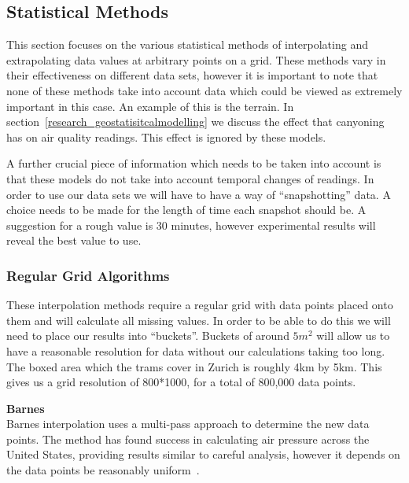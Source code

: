 	\subsection{Statistical Methods}\label{datavalidation_statisticalmethods}
		This section focuses on the various statistical methods of interpolating and extrapolating data values at arbitrary points on a grid. These methods vary in their effectiveness on different data sets, however it is important to note that none of these methods take into account data which could be viewed as extremely important in this case. An example of this is the terrain. In section~\ref{research_geostatisitcalmodelling} we discuss the effect that canyoning has on air quality readings. This effect is ignored by these models. 

		A further crucial piece of information which needs to be taken into account is that these models do not take into account temporal changes of readings. In order to use our data sets we will have to have a way of ``snapshotting'' data. A choice needs to be made for the length of time each snapshot should be. A suggestion for a rough value is 30 minutes, however experimental results will reveal the best value to use.



		\subsubsection{Regular Grid Algorithms}\label{datavalidation_regulargrid}

			These interpolation methods require a regular grid with data points placed onto them and will calculate all missing values. In order to be able to do this we will need to place our results into ``buckets''. Buckets of around $5m^{2}$ will allow us to have a reasonable resolution for data without our calculations taking too long. The boxed area which the trams cover in Zurich is roughly 4km by 5km. This gives us a grid resolution of 800*1000, for a total of 800,000 data points. 

			\textbf{Barnes}\label{datavalidation_barnes} \\

			Barnes interpolation uses a multi-pass approach to determine the new data points. The method has found success in calculating air pressure across the United States, providing results similar to careful analysis, however it depends on the data points be reasonably uniform~\cite{barnesinterpolation}.

